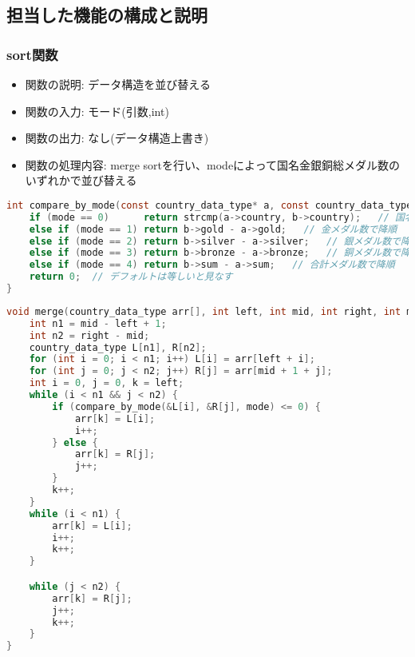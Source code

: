 \documentclass[a4paper,11pt]{jsarticle}
\begin{document}
\newpage


\subsection*{担当した機能の構成と説明}

\subsubsection*{sort関数}
\begin{itemize}
    \item 関数の説明: データ構造を並び替える
    \item 関数の入力: モード(引数,int)
    \item 関数の出力: なし(データ構造上書き)
    \item 関数の処理内容: merge sortを行い、modeによって国名金銀銅総メダル数のいずれかで並び替える
\end{itemize}

\begin{lstlisting}[caption=比較関数, label=sort1, language=C]
int compare_by_mode(const country_data_type* a, const country_data_type* b, int mode) {
    if (mode == 0)      return strcmp(a->country, b->country);   // 国名で昇順
    else if (mode == 1) return b->gold - a->gold;   // 金メダル数で降順
    else if (mode == 2) return b->silver - a->silver;   // 銀メダル数で降順
    else if (mode == 3) return b->bronze - a->bronze;   // 銅メダル数で降順
    else if (mode == 4) return b->sum - a->sum;   // 合計メダル数で降順
    return 0;  // デフォルトは等しいと見なす
}
\end{lstlisting}

\begin{lstlisting}[caption=マージ関数, label=sort2, language=C]
void merge(country_data_type arr[], int left, int mid, int right, int mode) {
    int n1 = mid - left + 1;
    int n2 = right - mid;
    country_data_type L[n1], R[n2];
    for (int i = 0; i < n1; i++) L[i] = arr[left + i];
    for (int j = 0; j < n2; j++) R[j] = arr[mid + 1 + j];
    int i = 0, j = 0, k = left;
    while (i < n1 && j < n2) {
        if (compare_by_mode(&L[i], &R[j], mode) <= 0) {
            arr[k] = L[i];
            i++;
        } else {
            arr[k] = R[j];
            j++;
        }
        k++;
    }
    while (i < n1) {
        arr[k] = L[i];
        i++;
        k++;
    }

    while (j < n2) {
        arr[k] = R[j];
        j++;
        k++;
    }
}
\end{lstlisting}
\end{document}
